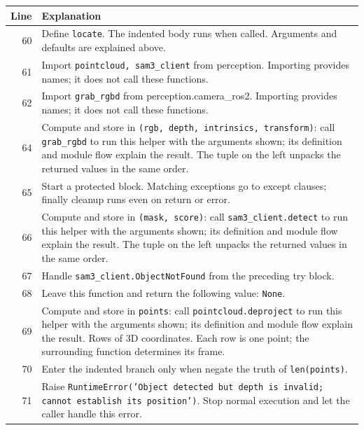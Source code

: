 \documentclass[11pt,a4paper]{book}
\begin{document}
\begin{longtable}{r p{}}

\textbf{Line} & \textbf{Explanation} \\ \hline \endhead

60 & Define \texttt{locate}. The indented body runs when called. Arguments and defaults are explained above. \\

61 & Import \texttt{pointcloud, sam3\_client} from perception. Importing provides names; it does not call these functions. \\

62 & Import \texttt{grab\_rgbd} from perception.camera\_ros2. Importing provides names; it does not call these functions. \\

64 & Compute and store in \texttt{(rgb, depth, intrinsics, transform)}: call \texttt{grab\_rgbd} to run this helper with the arguments shown; its definition and module flow explain the result. The tuple on the left unpacks the returned values in the same order. \\

65 & Start a protected block. Matching exceptions go to except clauses; finally cleanup runs even on return or error. \\

66 & Compute and store in \texttt{(mask, score)}: call \texttt{sam3\_client.detect} to run this helper with the arguments shown; its definition and module flow explain the result. The tuple on the left unpacks the returned values in the same order. \\

67 & Handle \texttt{sam3\_client.ObjectNotFound} from the preceding try block. \\

68 & Leave this function and return the following value: \texttt{None}. \\

69 & Compute and store in \texttt{points}: call \texttt{pointcloud.deproject} to run this helper with the arguments shown; its definition and module flow explain the result. Rows of 3D coordinates. Each row is one point; the surrounding function determines its frame. \\

70 & Enter the indented branch only when negate the truth of \texttt{len(points)}. \\

71 & Raise \texttt{RuntimeError('Object detected but depth is invalid; cannot establish its position')}. Stop normal execution and let the caller handle this error. \\


\end{longtable}
\end{document}
